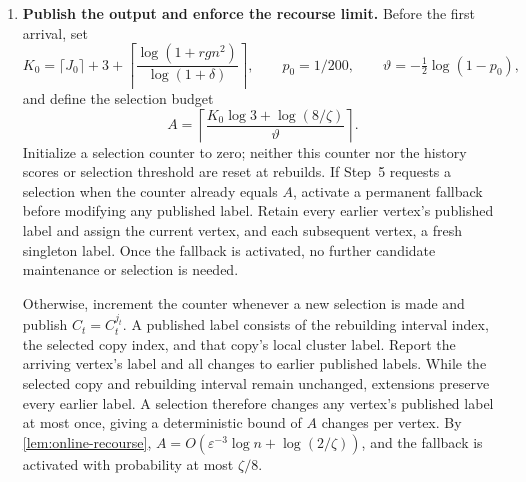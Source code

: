 \documentclass[11pt]{article}
\begin{document}
\begin{enumerate}
Initialize $H_j(0)=0$ for each copy and $\beta_0=0$. After the
rebuild or extensions at time $t$, update each copy's \emph{history
score} by
\[
 H_j(t)=
 \begin{cases}
 \max\{H_j(t-1),G_t(C_t^j)\},&j\text{ is active at time }t,\\
 H_j(t-1),&j\text{ is inactive at time }t.
 \end{cases}
\]
History scores are retained across rebuilds. Let $M_t$ be the
$\lceil T/80\rceil$th smallest value among
$H_1(t),\ldots,H_T(t)$, and update the \emph{selection threshold}
by
\[
 \beta_t=
 \begin{cases}
 (1+\delta)M_t,&M_t>\beta_{t-1},\\
 \beta_{t-1},&M_t\le\beta_{t-1}.
 \end{cases}
\]
Define the set of \emph{eligible copies} as
\[
 \mathcal I_t=
 \{j:j\text{ is active at time }t\text{ and }H_j(t)\le\beta_t\}.
\]
Retain the previously selected index unless it is absent from
$\mathcal I_t$, a rebuild has occurred, or $\beta_t$ has changed.
If any of these conditions holds, or if no copy has yet been
selected, request a new selection. Subject to the limit in Step~6,
choose an index $j_t$ uniformly from $\mathcal I_t$ using fresh
randomness. If no selection is requested, let $j_t=j_{t-1}$.
By \cref{lem:online-eligible}, the eligible set is always nonempty;
on the stated success event, every eligible candidate has low true
cost.

\item \textbf{Publish the output and enforce the recourse limit.}
Before the first arrival, set
\[
 K_0=\lceil J_0\rceil+3+
       \left\lceil\frac{\log(1+rgn^2)}{\log(1+\delta)}\right\rceil,
 \qquad p_0=1/200,
 \qquad \vartheta=-\tfrac12\log(1-p_0),
\]
and define the selection budget
\[
 A=\left\lceil
       \frac{K_0\log3+\log(8/\zeta)}{\vartheta}
    \right\rceil.
\]
Initialize a selection counter to zero; neither this counter nor
the history scores or selection threshold are reset at rebuilds.
If Step~5 requests a selection when the counter already equals $A$,
activate a permanent fallback before modifying any published label.
Retain every earlier vertex's published label and assign the current
vertex, and each subsequent vertex, a fresh singleton label. Once
the fallback is activated, no further candidate maintenance or
selection is needed.

Otherwise, increment the counter whenever a new selection is made
and publish $C_t=C_t^{j_t}$. A published label consists of the
rebuilding interval index, the selected copy index, and that copy's
local cluster label. Report the arriving vertex's label and all
changes to earlier published labels. While the selected copy and
rebuilding interval remain unchanged, extensions preserve every
earlier label. A selection therefore changes any vertex's published
label at most once, giving a deterministic bound of $A$ changes per
vertex. By \cref{lem:online-recourse},
$A=O(\varepsilon^{-3}\log n+\log(2/\zeta))$, and the fallback is
activated with probability at most $\zeta/8$.
\end{enumerate}
\end{document}
